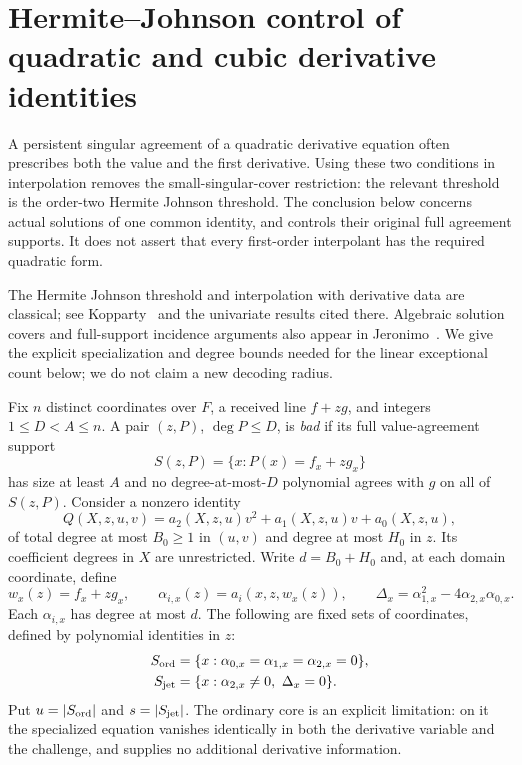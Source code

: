 \section{Hermite--Johnson control of quadratic and cubic derivative identities}
\label{app:hermite-johnson}

A persistent singular agreement of a quadratic derivative equation often
prescribes both the value and the first derivative.  Using these two
conditions in interpolation removes the small-singular-cover restriction:
the relevant threshold is the order-two Hermite Johnson threshold.
The conclusion below concerns actual solutions of one common identity,
and controls their original full agreement supports.  It does not assert
that every first-order interpolant has the required quadratic form.

The Hermite Johnson threshold and interpolation with derivative data are
classical; see Kopparty~\cite[Section~1.2]{kopparty-multiplicity} and the
univariate results cited there.  Algebraic solution covers and
full-support incidence arguments also appear in Jeronimo~\cite{jeronimo}.
We give the explicit specialization and degree bounds needed for the
linear exceptional count below; we do not claim a new decoding radius.



Fix $n$ distinct coordinates over $F$, a received line $f+zg$, and
integers $1\le D<A\le n$.  A pair $(z,P)$, $\deg P\le D$, is
\emph{bad} if its full value-agreement support
\[
 S(z,P)=\{x:P(x)=f_x+zg_x\}
\]
has size at least $A$ and no degree-at-most-$D$ polynomial agrees with
$g$ on all of $S(z,P)$.  Consider a nonzero identity
\begin{equation}
 Q(X,z,u,v)=a_2(X,z,u)v^2+a_1(X,z,u)v+a_0(X,z,u),
 \label{eq:hj-quadratic}
\end{equation}
of total degree at most $B_0\ge1$ in $(u,v)$ and degree at most $H_0$
in $z$.  Its coefficient degrees in $X$ are unrestricted.  Write
$d=B_0+H_0$ and, at each domain coordinate, define
\[
 w_x(z)=f_x+zg_x,\qquad
 \alpha_{i,x}(z)=a_i(x,z,w_x(z)),\qquad
 \Delta_x=\alpha_{1,x}^2-4\alpha_{2,x}\alpha_{0,x}.
\]
Each $\alpha_{i,x}$ has degree at most $d$.  The following are fixed
sets of coordinates, defined by polynomial identities in $z$:
\begin{align*}
 S_{\rm ord}&=\{x:\alpha_{0,x}=\alpha_{1,x}=\alpha_{2,x}=0\},\\
 S_{\rm jet}&=\{x:\alpha_{2,x}\ne0,\ \Delta_x=0\}.
\end{align*}
Put $u=|S_{\rm ord}|$ and $s=|S_{\rm jet}|$.  The ordinary core is an
explicit limitation: on it the specialized equation vanishes identically
in both the derivative variable and the challenge, and supplies no
additional derivative information.

